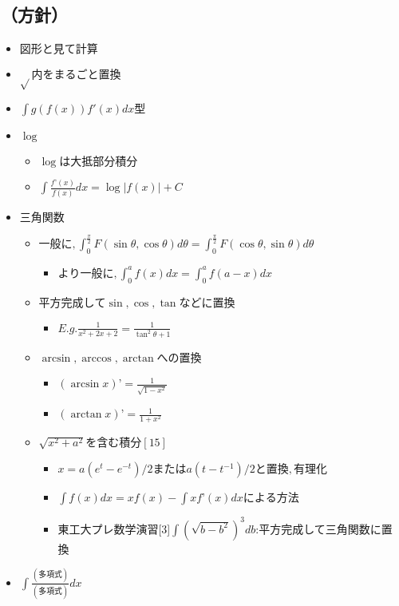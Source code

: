 \documentclass[dvipdfmx,uplatex]{jsarticle}
\begin{document}
\subsection{（方針）}
\begin{itemize}
	\item $ 図形と見て計算$
	\item $ \sqrt{} 内をまるごと置換$
	\item $ \int g(f(x))f'(x)dx 型$
	\item $ \log$
	\begin{itemize}
		\item $ \log は大抵部分積分$
		\item $ \int \frac{f’(x)}{f(x)}dx = \log |f(x)| + C$
	\end{itemize}
	\item $ 三角関数$
	\begin{itemize}
		\item $ 一般に, \int^{\frac{\pi}{2}}_0 F(\sin \theta, \cos \theta)d \theta = \int^{\frac{\pi}{2}}_0 F(\cos \theta, \sin \theta)d \theta$
		\begin{itemize}
			\item $ より一般に, \int^a_0 f(x)dx = \int^a_0 f(a-x)dx$
		\end{itemize}
		\item $ 平方完成して \sin , \cos , \tan などに置換$
		\begin{itemize}
			\item $ E.g. \frac{1}{x^2+2x+2} = \frac{1}{\tan^2 \theta + 1}$
		\end{itemize}
		\item $ \arcsin, \arccos, \arctan への置換$
		\begin{itemize}
			\item $ (\arcsin x)’ = \frac{1}{\sqrt{1 - x^2}}$
			\item $ (\arctan x)’ = \frac{1}{1 + x^2}$
		\end{itemize}
		\item $ \sqrt{x^2 + a^2} を含む積分 [15]$
		\begin{itemize}
			\item $  x = a(e^t - e^{-t})/2 または a(t - t^{-1})/2 と置換,有理化$
			\item $ \int f(x)dx = xf(x) - \int xf’(x)dx による方法$
			\item 東工大プレ数学演習[3]$\int (\sqrt{b-b^2})^3db$:平方完成して三角関数に置換
		\end{itemize}
	\end{itemize}
	\item $ \int \frac{(多項式)}{(多項式)}dx$

\end{itemize}
\end{document}
